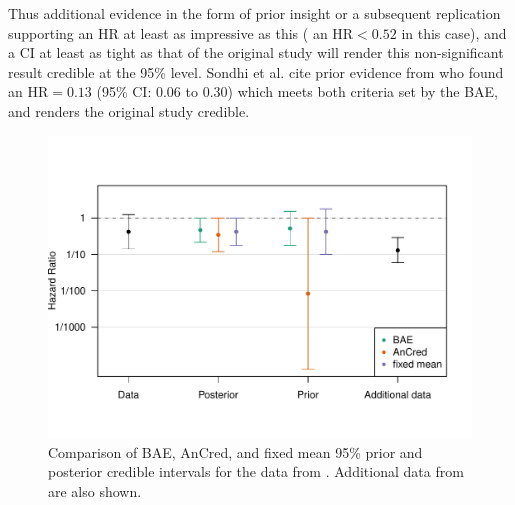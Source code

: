 Thus additional evidence in the form of prior insight or a subsequent
replication supporting an HR at least as impressive as this (\ie{} an
$\mbox{HR} < 0.52$ in this case), and a CI at least as tight as that of the
original study will render this non-significant result credible at the 95\%
level. Sondhi et al. cite prior evidence from \citet{Innocenti2019} who found an
$\mbox{HR} = 0.13$ (95\% CI: 0.06 to 0.30) which meets both criteria set by the
BAE, and renders the original study credible.





\begin{figure}[!htb]
\begin{knitrout}
\color{fgcolor}
\includegraphics[width=\maxwidth]{images/paper5/bae-comparison-fig-1}
\end{knitrout}
\caption{Comparison of BAE, AnCred, and fixed mean 95\% prior and posterior
  credible intervals for the data from \citet{Sondhi2021}. Additional data from
  \citet{Innocenti2019} are also shown.}
\label{fig5:illustration}
\end{figure}


